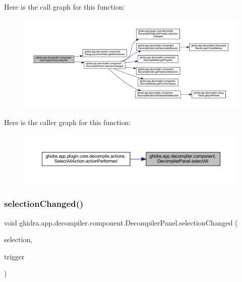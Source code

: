 Here is the call graph for this function\+:
\nopagebreak
\begin{figure}[H]
\begin{center}
\leavevmode
\includegraphics[width=350pt]{classghidra_1_1app_1_1decompiler_1_1component_1_1_decompiler_panel_a316699fe182bafdb7fcbe0e19a08e962_cgraph}
\end{center}
\end{figure}
Here is the caller graph for this function\+:
\nopagebreak
\begin{figure}[H]
\begin{center}
\leavevmode
\includegraphics[width=350pt]{classghidra_1_1app_1_1decompiler_1_1component_1_1_decompiler_panel_a316699fe182bafdb7fcbe0e19a08e962_icgraph}
\end{center}
\end{figure}
\mbox{\label{classghidra_1_1app_1_1decompiler_1_1component_1_1_decompiler_panel_abd4a85466441f38db1df00ca36fdb804}} 
\subsubsection{\texorpdfstring{selectionChanged()}{selectionChanged()}}
{\footnotesize\ttfamily void ghidra.\+app.\+decompiler.\+component.\+Decompiler\+Panel.\+selection\+Changed (\begin{DoxyParamCaption}\item[{Field\+Selection}]{selection,  }\item[{Event\+Trigger}]{trigger }\end{DoxyParamCaption})\hspace{0.3cm}{\ttfamily [inline]}}



